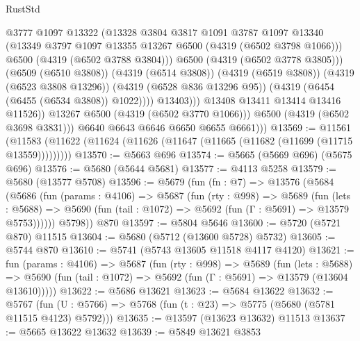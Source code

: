 \begin{lexlean}{RustStd}
\begin{coremodule}
                              @3777
                              @1097
                              @13322
                              (@13328
                                @3804
                                @3817
                                @1091
                                @3787
                                @1097
                                @13340
                                (@13349 @3797 @1097 @13355 @13267 @6500 (@4319 (@6502 @3798 @1066)))
                                @6500
                                (@4319 (@6502 @3788 @3804)))
                              @6500
                              (@4319 (@6502 @3778 @3805)))
                            (@6509 (@6510 @3808))
                            (@4319 (@6514 @3808))
                            (@4319 (@6519 @3808))
                            (@4319 (@6523 @3808 @13296))
                            (@4319 (@6528 @836 @13296 @95))
                            (@4319 (@6454 (@6455 (@6534 @3808)) @1022))))
                        @13403)))
                  @13408
                  @13411
                  @13414
                  @13416
                  @11526))
              @13267
              @6500
              (@4319 (@6502 @3770 @1066)))
            @6500
            (@4319 (@6502 @3698 @3831)))
          @6640
          @6643
          @6646
          @6650
          @6655
          @6661)))
@13569 := @11561
    (@11583 (@11622 (@11624 (@11626 (@11647 (@11665 (@11682 (@11699 (@11715 @13559)))))))))
@13570 := @5663 @696
@13574 := @5665 (@5669 @696) (@5675 @696)
@13576 := @5680 (@5644 @5681)
@13577 := @4113 @5258
@13579 := @5680 (@13577 @5708)
@13596 := @5679
    (fun (fn : @7) =>
    @13576
      (@5684
        (@5686
          (fun (params : @4106) =>
          @5687
            (fun (rty : @998) =>
            @5689
              (fun (lets : @5688) =>
              @5690 (fun (tail : @1072) => @5692 (fun (Γ : @5691) => @13579 @5753))))))
        @5798))
    @870
@13597 := @5804 @5646
@13600 := @5720 (@5721 @870) @11515
@13604 := @5680 (@5712 (@13600 @5728) @5732)
@13605 := @5744 @870
@13610 := @5741 (@5743 @13605 @11518 @4117 @4120)
@13621 := fun (params : @4106) =>
  @5687
    (fun (rty : @998) =>
    @5689
      (fun (lets : @5688) =>
      @5690 (fun (tail : @1072) => @5692 (fun (Γ : @5691) => @13579 (@13604 @13610)))))
@13622 := @5686 @13621
@13623 := @5684 @13622
@13632 := @5767
    (fun (U : @5766) => @5768 (fun (t : @23) => @5775 (@5680 (@5781 @11515 @4123) @5792)))
@13635 := @13597 (@13623 @13632) @11513
@13637 := @5665 @13622 @13632
@13639 := @5849 @13621 @3853

\end{coremodule}
\end{lexlean}
